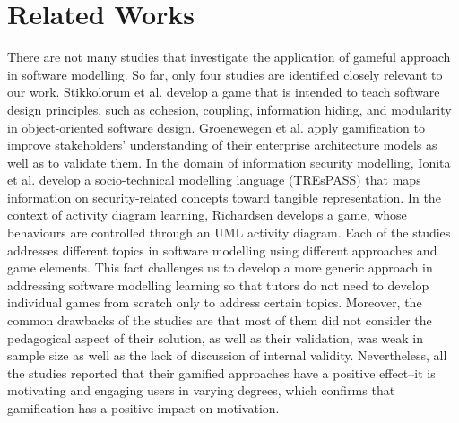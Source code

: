 \documentclass[conference]{IEEEtran}
\begin{document}
\section{Related Works}
\label{Related Works}
There are not many studies that investigate the application of gameful approach in software modelling. So far, only four studies are identified closely relevant to our work. Stikkolorum et al. \cite{Stikkolorum2014} develop a game that is intended to teach software design principles, such as cohesion, coupling, information hiding, and modularity in object-oriented software design. Groenewegen et al. \cite{Groenewegen2010} apply gamification to improve stakeholders' understanding of their enterprise architecture models as well as to validate them. In the domain of information security modelling, Ionita et al.\cite{Ionita2015} develop a socio-technical modelling language (TREsPASS) that maps information on security-related concepts toward tangible representation. In the context of activity diagram learning, Richardsen \cite{Richardsen2014} develops a game, whose behaviours are controlled through an UML activity diagram. Each of the studies addresses different topics in software modelling using different approaches and game elements. This fact challenges us to develop a more generic approach in addressing software modelling learning so that tutors do not need to develop individual games from scratch only to address certain topics. Moreover, the common drawbacks of the studies are that most of them did not consider the pedagogical aspect of their solution, as well as their validation, was weak in sample size as well as the lack of discussion of internal validity. Nevertheless, all the studies reported that their gamified approaches have a positive effect--it is motivating and engaging users in varying degrees, which confirms that gamification has a positive impact on motivation.

%
%
\end{document}

